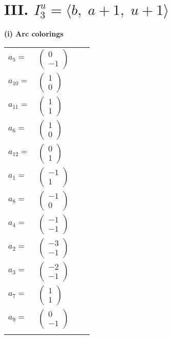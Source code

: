 \documentclass[1p]{elsarticle_modified}
\theoremstyle{definition}
\begin{document}
\centering \section*{III. $I^u_{3}= \langle b,\;a+1,\;u+1 \rangle$}
\flushleft \textbf{(i) Arc colorings}\\
\begin{tabular}{m{7pt} m{180pt} m{7pt} m{180pt} }
\flushright $a_{5}=$&$\begin{pmatrix}0\\-1\end{pmatrix}$ \\
\flushright $a_{10}=$&$\begin{pmatrix}1\\0\end{pmatrix}$ \\
\flushright $a_{11}=$&$\begin{pmatrix}1\\1\end{pmatrix}$ \\
\flushright $a_{6}=$&$\begin{pmatrix}1\\0\end{pmatrix}$ \\
\flushright $a_{12}=$&$\begin{pmatrix}0\\1\end{pmatrix}$ \\
\flushright $a_{1}=$&$\begin{pmatrix}-1\\1\end{pmatrix}$ \\
\flushright $a_{8}=$&$\begin{pmatrix}-1\\0\end{pmatrix}$ \\
\flushright $a_{4}=$&$\begin{pmatrix}-1\\-1\end{pmatrix}$ \\
\flushright $a_{2}=$&$\begin{pmatrix}-3\\-1\end{pmatrix}$ \\
\flushright $a_{3}=$&$\begin{pmatrix}-2\\-1\end{pmatrix}$ \\
\flushright $a_{7}=$&$\begin{pmatrix}1\\1\end{pmatrix}$ \\
\flushright $a_{9}=$&$\begin{pmatrix}0\\-1\end{pmatrix}$\\&\end{tabular}
\end{document}
